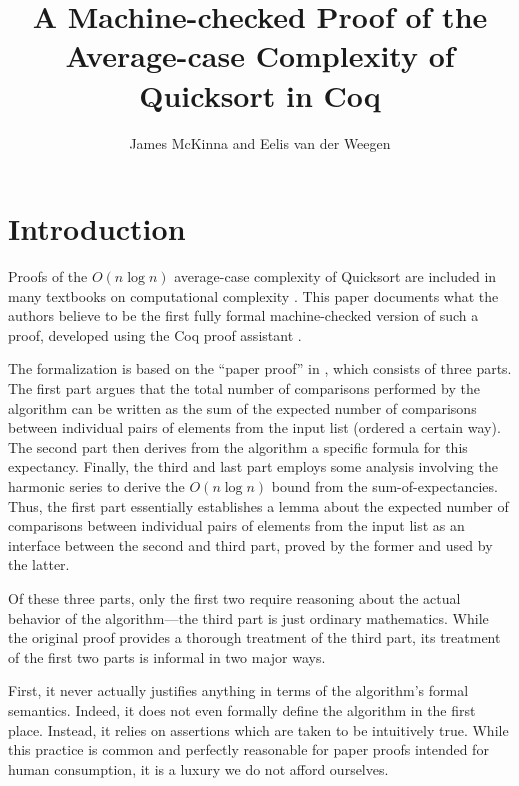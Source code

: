 \documentclass[runningheads]{llncs}
\newcommand{\theauthors}{James McKinna and Eelis van der Weegen}
\newcommand{\thetitle}{A Machine-checked Proof of the Average-case Complexity of Quicksort in Coq}
\begin{document}
\nocite{*}

\title{\thetitle}

\authorrunning{\em}
\titlerunning{\em}

\author{\theauthors}


\maketitle

\begin{abstract}
  
\end{abstract}

\section{Introduction}

Proofs of the $O(n \log n)$ average-case complexity of Quicksort \cite{HoareQuick} are included in many textbooks on computational complexity \cite[for example]{introtoalgos}.
This paper documents what the authors believe to be the first fully formal machine-checked version of such a proof, developed using the Coq proof assistant \cite{coq}.

The formalization is based on the ``paper proof'' in \cite{introtoalgos}, which consists of three parts. The first part argues that the total number of comparisons performed by the algorithm can be written as the sum of the expected number of comparisons between individual pairs of elements from the input list (ordered a certain way). The second part then derives from the algorithm a specific formula for this expectancy. Finally, the third and last part employs some analysis involving the harmonic series to derive the $O(n \log n)$ bound from the sum-of-expectancies. Thus, the first part essentially establishes a lemma about the expected number of comparisons between individual pairs of elements from the input list as an interface between the second and third part, proved by the former and used by the latter.

Of these three parts, only the first two require reasoning about the actual behavior of the algorithm---the third part is just ordinary mathematics. While the original proof provides a thorough treatment of the third part, its treatment of the first two parts is informal in two major ways.

First, it never actually justifies anything in terms of the algorithm's formal semantics. Indeed, it does not even formally define the algorithm in the first place. Instead, it relies on assertions which are taken to be intuitively true. While this practice is common and perfectly reasonable for paper proofs intended for human consumption, it is a luxury we do not afford ourselves.
\end{document}
